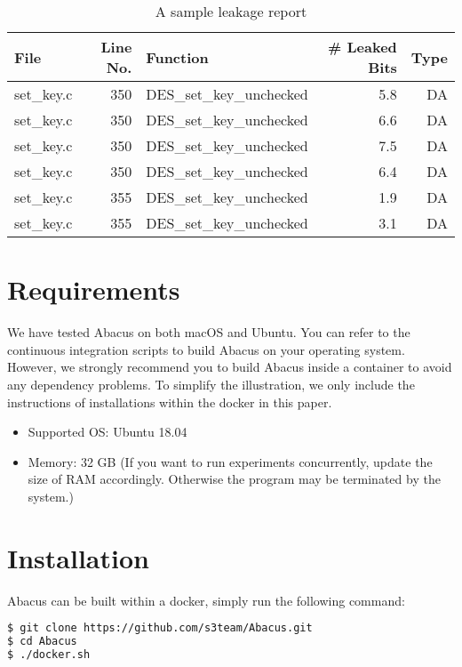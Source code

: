 \documentclass[10pt,conference]{IEEEtran}
\newcommand{\tool}{\textsf{Abacus}}
\begin{document}
\begin{table}[h!]
\centering\tiny\scriptsize
\caption{A sample leakage report}\label{tab:DESOpenSSL1.1.1}
\begin{tabular}{lrlrr}
\toprule
\textbf{File} & \textbf{Line No.} & \textbf{Function} & \textbf{\# Leaked Bits} & \textbf{Type} \\\toprule
set\_key.c& 350&DES\_set\_key\_unchecked&5.8 &DA\\
set\_key.c& 350&DES\_set\_key\_unchecked&6.6 &DA\\
set\_key.c& 350&DES\_set\_key\_unchecked&7.5 &DA\\
set\_key.c& 350&DES\_set\_key\_unchecked&6.4 &DA\\
set\_key.c& 355&DES\_set\_key\_unchecked&1.9 &DA\\
set\_key.c& 355&DES\_set\_key\_unchecked&3.1 &DA\\
\bottomrule
\end{tabular}
\end{table}

\section{Requirements}
We have tested \tool{} on both macOS and Ubuntu. You can refer to the continuous integration scripts to build \tool{} on your operating system. However, we strongly recommend you to build \tool{} inside a container to avoid any dependency problems. To simplify the illustration, we only include the instructions of installations within the docker in this paper.
\begin{itemize}
\item Supported OS: Ubuntu 18.04
\item Memory: 32 GB (If you want to run experiments concurrently, update the size of RAM
     accordingly. Otherwise the program may be terminated by the system.)
\end{itemize}

\section{Installation}

\tool{} can be built within a docker, simply run the following command:

\begin{lstlisting}[language=bash]
$ git clone https://github.com/s3team/Abacus.git
$ cd Abacus
$ ./docker.sh
\end{lstlisting}
\end{document}
